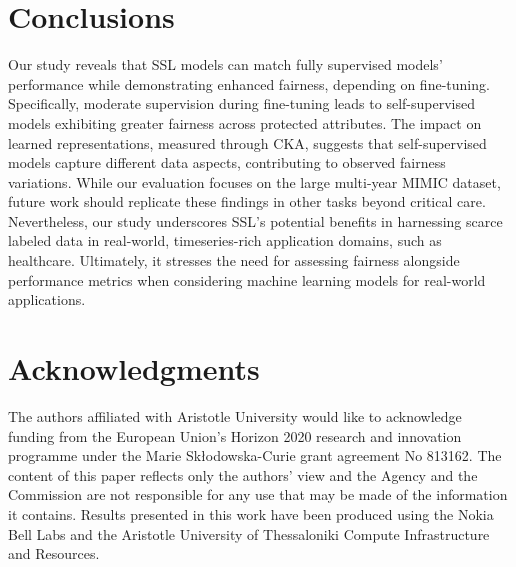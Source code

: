 \documentclass[letterpaper]{article} %
\begin{document}
\section{Conclusions}
Our study reveals that SSL models can match fully supervised models' performance while demonstrating enhanced fairness, depending on fine-tuning. Specifically, moderate supervision during fine-tuning leads to self-supervised models exhibiting greater fairness across protected attributes. The impact on learned representations, measured through CKA, suggests that self-supervised models capture different data aspects, contributing to observed fairness variations.
While our evaluation focuses on the large multi-year MIMIC dataset, future work should replicate these findings in other tasks beyond critical care. Nevertheless, our study underscores SSL's potential benefits in harnessing scarce labeled data in real-world, timeseries-rich application domains, such as healthcare. Ultimately, it stresses the need for assessing fairness alongside performance metrics when considering machine learning models for real-world applications.

\section{Acknowledgments}
The authors affiliated with Aristotle University would like to acknowledge funding from the European Union’s Horizon 2020 research and innovation programme under the Marie Skłodowska-Curie grant agreement No 813162. The content of this paper reflects only the authors' view and the Agency and the Commission are not responsible for any use that may be made of the information it contains. 
Results presented in this work have been produced using the Nokia Bell Labs and the Aristotle University of Thessaloniki Compute Infrastructure and Resources. 



\end{document}
